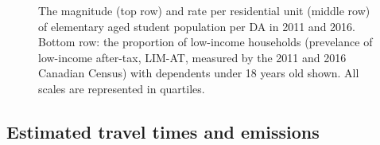\documentclass[
default
]{sn-jnl}
\begin{document}
\begin{figure}[H]


\caption{\label{fig-Fig2}The magnitude (top row) and rate per
residential unit (middle row) of elementary aged student population per
DA in 2011 and 2016. Bottom row: the proportion of low-income households
(prevelance of low-income after-tax, LIM-AT, measured by the 2011 and
2016 Canadian Census) with dependents under 18 years old shown. All
scales are represented in quartiles.}

\end{figure}%

\subsection{Estimated travel times and
emissions}\label{estimated-travel-times-and-emissions}
\end{document}
